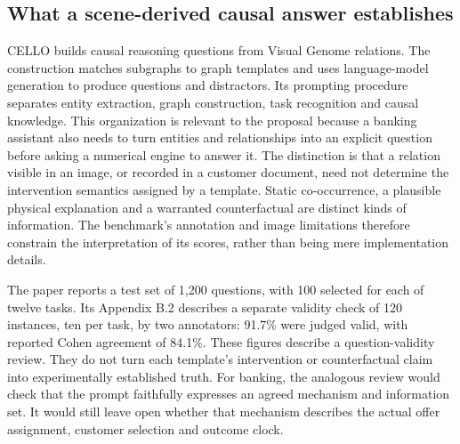 \subsection{What a scene-derived causal answer establishes}

CELLO builds causal reasoning questions from Visual Genome relations. The
construction matches subgraphs to graph templates and uses language-model
generation to produce questions and distractors. Its prompting procedure
separates entity extraction, graph construction, task recognition and causal
knowledge. This organization is relevant to the proposal because a banking
assistant also needs to turn entities and relationships into an explicit
question before asking a numerical engine to answer it. The distinction is
that a relation visible in an image, or recorded in a customer document, need
not determine the intervention semantics assigned by a template. Static
co-occurrence, a plausible physical explanation and a warranted counterfactual
are distinct kinds of information. The benchmark's annotation and image
limitations therefore constrain the interpretation of its scores, rather than
being mere implementation details.~\citep{exec17_benchmark_cello}

The paper reports a test set of 1,200 questions, with 100 selected for each of
twelve tasks. Its Appendix B.2 describes a separate validity check of 120
instances, ten per task, by two annotators: 91.7\% were judged valid, with
reported Cohen agreement of 84.1\%. These figures describe a question-validity
review. They do not turn each template's intervention or counterfactual claim
into experimentally established truth. For banking, the analogous review
would check that the prompt faithfully expresses an agreed mechanism and
information set. It would still leave open whether that mechanism describes
the actual offer assignment, customer selection and outcome clock.
\citep{exec17_benchmark_cello}

